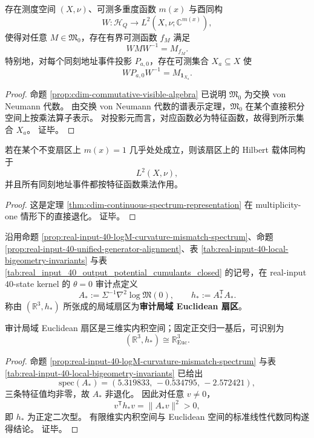 \begin{theorem}[连续谱表示]\label{thm:cdim-continuous-spectrum-representation}
存在测度空间 \((X,\nu)\)、可测多重度函数 \(m(x)\) 与酉同构
\[
W:\mathcal H_Q\longrightarrow L^2(X,\nu;\mathbb C^{m(x)}),
\]
使得对任意 \(M\in\mathfrak M_0\)，存在有界可测函数 \(f_M\) 满足
\[
WMW^{-1}=M_{f_M}.
\]
特别地，对每个同刻地址事件投影 \(P_{a,0}\)，存在可测集合 \(X_a\subseteq X\) 使
\[
WP_{a,0}W^{-1}=M_{\mathbf 1_{X_a}}.
\]
\end{theorem}
\begin{proof}
命题 \ref{prop:cdim-commutative-visible-algebra} 已说明 \(\mathfrak M_0\) 为交换 von Neumann 代数。
由交换 von Neumann 代数的谱表示定理，\(\mathfrak M_0\) 在某个直接积分空间上按乘法算子表示。
对投影元而言，对应函数必为特征函数，故得到所示集合 \(X_a\)。
证毕。
\end{proof}

\begin{corollary}[坐标表示]\label{cor:cdim-coordinate-representation}
若在某个不变扇区上 \(m(x)=1\) 几乎处处成立，则该扇区上的 Hilbert 载体同构于
\[
L^2(X,\nu),
\]
并且所有同刻地址事件都按特征函数乘法作用。
\end{corollary}
\begin{proof}
这是定理 \ref{thm:cdim-continuous-spectrum-representation} 在 multiplicity-one 情形下的直接退化。
证毕。
\end{proof}

\begin{definition}\label{def:cdim-local-euclidean-sector}
沿用命题 \ref{prop:real-input-40-logM-curvature-mismatch-spectrum}、命题 \ref{prop:real-input-40-unified-generator-alignment}、表 \ref{tab:real-input-40-local-bigeometry-invariants} 与表 \ref{tab:real_input_40_output_potential_cumulants_closed} 的记号，在 real-input \(40\)-state kernel 的 \(\theta=0\) 审计点定义
\[
A_\ast:=\Sigma^{-1}\nabla^2\log\mathfrak M(0),
\qquad
h_\ast:=A_\ast^{\mathsf T}A_\ast.
\]
称由 \((\mathbb R^3,h_\ast)\) 所张成的局域扇区为\textbf{审计局域 Euclidean 扇区}。
\end{definition}

\begin{proposition}\label{prop:cdim-local-euclidean-sector-positive}
审计局域 Euclidean 扇区是三维实内积空间；固定正交归一基后，可识别为
\[
(\mathbb R^3,h_\ast)\cong \mathbb R^3_{\mathrm{Euc}}.
\]
\end{proposition}
\begin{proof}
命题 \ref{prop:real-input-40-logM-curvature-mismatch-spectrum} 与表 \ref{tab:real-input-40-local-bigeometry-invariants} 已给出
\[
\mathrm{spec}(A_\ast)=(5.319833,\,-0.534795,\,-2.572421),
\]
三条特征值均非零，故 \(A_\ast\) 非退化。
因此对任意 \(v\neq 0\)，
\[
v^{\mathsf T}h_\ast v
=
\lVert A_\ast v\rVert^2
>
0,
\]
即 \(h_\ast\) 为正定二次型。
有限维实内积空间与 Euclidean 空间的标准线性代数同构遂得结论。
证毕。
\end{proof}


